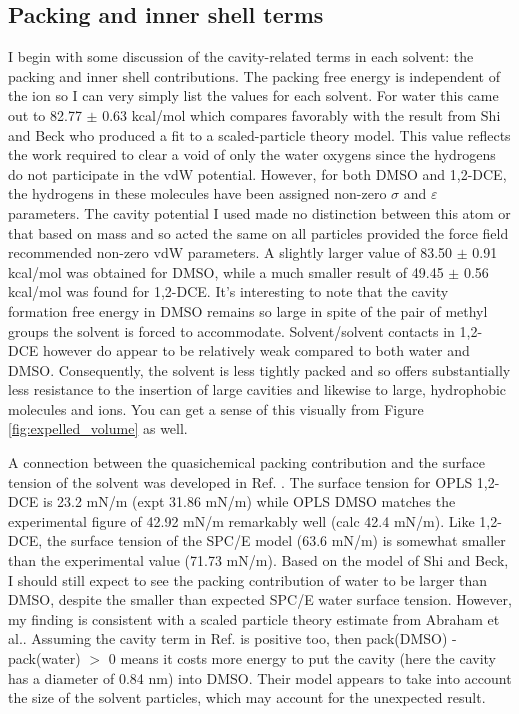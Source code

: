 \begin{tatb}
  \subsection{\label{ch6:sec2:level2}Packing and inner shell terms}
  I begin with some discussion of the cavity-related terms in each solvent: the packing and inner shell contributions. The packing free energy is independent of the 
  ion so I can very simply list the values for each solvent. For water this came out to 82.77 $\pm$ 0.63 kcal/mol which compares favorably with the result from Shi and
  Beck who produced a fit to a scaled-particle theory model\cite{shi2013length}. This value reflects the work required to clear a void of only the water oxygens since
  the hydrogens do not participate in the vdW potential. However, for both DMSO and 1,2-DCE, the hydrogens in these molecules have been assigned non-zero $\sigma$
  and $\varepsilon$ parameters. The cavity potential I used made no distinction between this atom or that based on mass and so acted the same on all particles provided 
  the force field recommended non-zero vdW parameters. A slightly larger value of 83.50 $\pm$ 0.91 kcal/mol was obtained for DMSO, while a much smaller result of 49.45
  $\pm$ 0.56 kcal/mol was found for 1,2-DCE. It's interesting to note that the cavity formation free energy in DMSO remains so large in spite of the pair of methyl 
  groups the solvent is forced to accommodate. Solvent/solvent contacts in 1,2-DCE however do appear to be relatively weak compared to both water and DMSO. Consequently, 
  the solvent is less tightly packed and so offers substantially less resistance to the insertion of large cavities and likewise to large, hydrophobic molecules and ions. 
  You can get a sense of this visually from Figure \ref{fig:expelled_volume} as well.

  A connection between the quasichemical packing contribution and the surface tension of the solvent was developed in Ref. \cite{shi2013length}. The surface tension for
  OPLS 1,2-DCE is 23.2 mN/m (expt 31.86 mN/m) while OPLS DMSO matches the experimental figure of 42.92 mN/m remarkably well (calc 42.4 mN/m)\cite{caleman2011force}. 
  Like 1,2-DCE, the surface tension of the SPC/E model (63.6 mN/m) is somewhat smaller than the experimental value (71.73 mN/m)\cite{vega2007surface}. Based on the model
  of Shi and Beck, I should still expect to see the packing contribution of water to be larger than DMSO, despite the smaller than expected SPC/E water surface tension.
  However, my finding is consistent with a scaled particle theory estimate from Abraham et al.\cite{abraham1979use}. Assuming the cavity term in Ref. \cite{abraham1979use}
  is positive too, then pack(DMSO) - pack(water) $>$ 0 means it costs more energy to put the cavity (here the cavity has a diameter of 0.84 nm) into DMSO. Their model
  appears to take into account the size of the solvent particles, which may account for the unexpected result.


\end{tatb}
